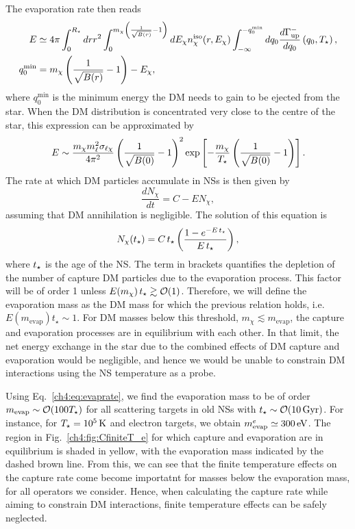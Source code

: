 The evaporation rate then reads
\small
\begin{align}
E &\simeq 4\pi \int_0^{R_\star} dr r^2 \int_0^{m_\chi\left(\frac{1}{\sqrt{B(r)}}-1\right)}dE_\chi n_\chi^\mathrm{iso}(r,E_\chi) \int_{-\infty}^{-q_0^\mathrm{min}} dq_0 \frac{d\Gamma^-_\mathrm{up}}{dq_0}\left(q_0,T_\star\right), \\
q_0^\mathrm{min} & = m_\chi\left(\frac{1}{\sqrt{B(r)}}-1\right)-E_\chi,
\label{ch4:eq:evaprate}
\end{align}
\normalsize
where $q_0^\mathrm{min}$ is the minimum energy the DM needs to gain to be ejected from the star.
When the DM distribution is concentrated very close to the centre of the star, this expression can be approximated by
\begin{equation}
E \sim  \frac{ m_\chi m_\ell^2\sigma_{\ell\chi}}{4\pi^2} \left(\frac{1}{\sqrt{B(0)}}-1\right)^2  \exp\left[{-\frac{m_\chi}{T_\star}}\left(\frac{1}{\sqrt{B(0)}}-1\right)\right]. \end{equation}
% 
The rate at which DM particles accumulate in NSs is then given by
\begin{equation}
\dfrac{dN_\chi}{dt} = C- E N_\chi,
\end{equation}
assuming that DM annihilation is negligible. The solution of this equation is 
\begin{equation}
N_\chi(t_\star) = C \, t_\star \left( \frac{ 1-e^{-E \, t_\star}}{E \, t_\star} \right),   
\end{equation}
where $t_\star$ is the age of the NS. The term in brackets quantifies the depletion of the number of capture DM particles due to the evaporation process. This factor will be of order 1 unless $E(m_\chi) \, t_\star \gtrsim {\cal O}(1)$. Therefore, we will define the evaporation mass as the DM mass for which the previous relation holds, i.e.  $E(m_\mathrm{evap}) t_\star \sim 1$. 
For DM masses below this threshold, $m_\chi \lesssim m_\mathrm{evap}$, the capture and evaporation processes are in equilibrium with each other. In that limit, the net energy exchange in the star due to the combined effects of DM capture and evaporation would be negligible, and hence we would be unable to constrain DM interactions using the NS temperature as a probe.


Using Eq.~\ref{ch4:eq:evaprate}, we find the evaporation mass to be of order $m_\mathrm{evap}\sim\mathcal{O}(100T_\star)$ for all scattering targets in old NSs with $t_\star\sim{\cal O}(10 {\rm \,Gyr})$. For instance, for $T_\star=10^5{\rm \,K}$ and electron targets, we obtain $m^e_\mathrm{evap}\simeq 300{\rm \,eV}$. 
The region in Fig.~\ref{ch4:fig:CfiniteT_e} for which capture and evaporation are in equilibrium is shaded in yellow, with the evaporation mass indicated by the dashed brown line. From this, we can see that the finite temperature effects on the capture rate come become importatnt for masses below the evaporation mass, for all operators we consider. Hence, when calculating the capture rate while aiming to constrain DM interactions, finite temperature effects can be safely neglected.



